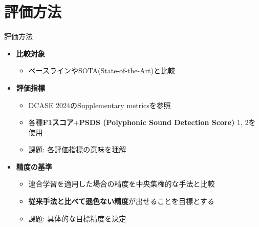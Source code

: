 \documentclass[unicode,12pt,aspectratio=169,dvipdfmx]{beamer}
\begin{document}
\section{評価方法}
\begin{frame}{評価方法}
    \begin{itemize}
        \item \textbf{比較対象}
        \begin{itemize}
            \item ベースラインやSOTA(State-of-the-Art)と比較
        \end{itemize}
        \item \textbf{評価指標}
        \begin{itemize}
            \item DCASE 2024のSupplementary metricsを参照
            \item 各種\textbf{F1スコア}+\textbf{PSDS (Polyphonic Sound Detection Score)} 1, 2を使用
            \item 課題: 各評価指標の意味を理解
        \end{itemize}
        \item \textbf{精度の基準}
        \begin{itemize}
            \item 連合学習を適用した場合の精度を中央集権的な手法と比較
            \item \textbf{従来手法と比べて遜色ない精度}が出せることを目標とする
            \item 課題: 具体的な目標精度を決定
        \end{itemize}
    \end{itemize}
\end{frame}

\end{document}
